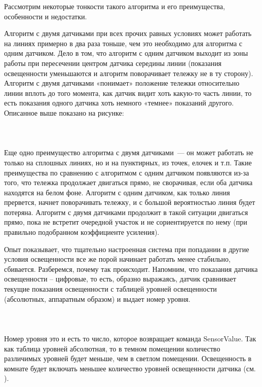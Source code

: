 Рассмотрим некоторые тонкости такого алгоритма и его преимущества, особенности и недостатки. 

Алгоритм с двумя датчиками при всех прочих равных условиях может работать на линиях примерно в два раза тоньше, чем это необходимо для алгоритма с одним датчиком. Дело в том, что алгоритм с одним датчиком выходит из зоны работы при пересечении центром датчика середины линии (показания освещенности уменьшаются и алгоритм поворачивает тележку не в ту сторону). Алгоритм с двумя датчиками «понимает» положение тележки относительно линии вплоть до того момента, как датчик видит хоть какую-то часть линии, то есть показания одного датчика хоть немного «темнее» показаний другого. Описанное выше показано на рисунке:\\\\

\\\\

Еще одно преимущество алгоритма с двумя датчиками~--- он может работать не только на сплошных линиях, но и на пунктирных, из точек, елочек и т.п. Такие преимущества по сравнению с алгоритмом с одним датчиком появляются из-за того, что тележка продолжает двигаться прямо, не сворачивая, если оба датчика находятся на белом фоне. Алгоритм с одним датчиком, как только линия прервется, начнет поворачивать тележку, и с большой вероятностью линия будет потеряна. Алгоритм с двумя датчиками продолжит в такой ситуации двигаться прямо, пока не встретит очередной участок и не сориентируется по нему (при правильно подобранном коэффициенте усиления).

Опыт показывает, что тщательно настроенная система при попадании в другие условия освещенности все же порой начинает работать менее стабильно, сбивается. Разберемся, почему так происходит. Напомним, что показания датчика освещенности – цифровые, то есть, образно выражаясь, датчик сравнивает текущие показания освещенности с таблицей уровней освещенности (абсолютных, аппаратным образом) и выдает номер уровня. \\\\

\\\\

Номер уровня это и есть то число, которое возвращает команда SensorValue. Так как таблица уровней абсолютная, то в темном помещении количество различимых уровней будет меньше, чем в светлом помещении.  Освещенность в комнате будет включать меньшее количество уровней освещенности датчика (см. ).\\\\

